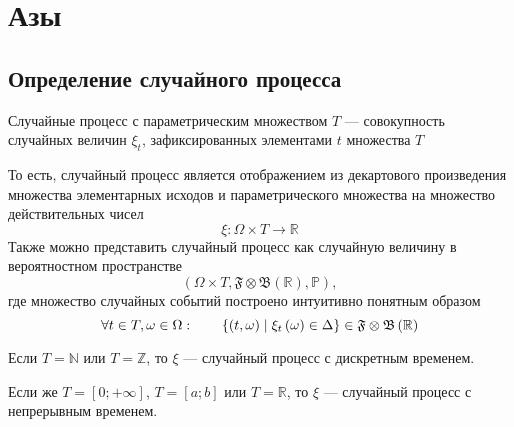 \chapter{Азы}
\section{Определение случайного процесса}

\begin{definition}
  Случайные процесс с параметрическим множеством $T$ --- совокупность случайных
  величин $\xi_t$, зафиксированных элементами $t$ множества $T$
\end{definition}

То есть, случайный процесс является отображением из декартового произведения
множества элементарных исходов и параметрического множества на множество
действительных чисел
\begin{equation*}
  \xi: \Omega \times T \rightarrow \mathbb{R}
\end{equation*}
Также можно представить случайный процесс как случайную величину в вероятностном
пространстве
\begin{equation*}
  \left( \Omega \times T,
    \mathfrak{F} \otimes \mathfrak{B}\left( \mathbb{R} \right), \mathbb{P}
    \right),
\end{equation*}
где множество случайных событий построено интуитивно понятным образом
\begin{equation*}
  \forall t \in T, \omega \in \Omega:\qquad
  \left\{ \left( t, \omega \right) \;\middle|\; \xi_t\left( \omega \right)
      \in \Delta \right\}
    \in \mathfrak{F} \otimes \mathfrak{B}\left( \mathbb{R} \right)
\end{equation*}

\begin{remark}
  Если $T = \mathbb{N}$ или $T = \mathbb{Z}$, то $\xi$ --- случайный процесс с
  дискретным временем.
\end{remark}

\begin{remark}
  Если же $T = \left[ 0; +\infty \right]$, $T = \left[ a; b \right]$ или
  $T = \mathbb{R}$, то $\xi$ --- случайный процесс с непрерывным временем.
\end{remark}

